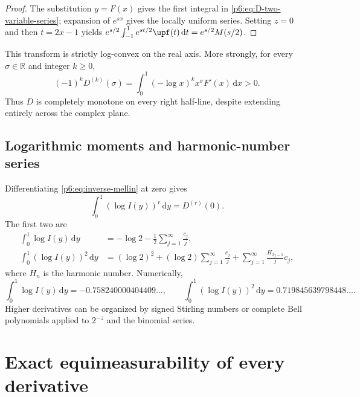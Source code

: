 \documentclass[11pt,oneside]{article}
\theoremstyle{definition}
\theoremstyle{remark}
\newcommand{\R}{\mathbb R}
\newcommand{\dd}{\,\mathrm d}
\newcommand{\1}{\mathbf 1}
\begin{document}
\begin{proof}
The substitution \(y=F(x)\) gives the first integral in
\eqref{p6:eq:D-two-variable-series}; expansion of \(e^{sx}\) gives the locally uniform
series.  Setting \(z=0\) and then \(t=2x-1\) yields
\(
 e^{s/2}\int_{-1}^1e^{st/2}\upf(t)\dd t=e^{s/2}M(s/2)
\).
\end{proof}

This transform is strictly log-convex on the real axis.  More strongly, for every
\(\sigma\in\R\) and integer \(k\ge0\),
\begin{equation}
 (-1)^kD^{(k)}(\sigma)
 =\int_0^1(-\log x)^kx^\sigma F'(x)\dd x>0.              \label{p6:eq:D-complete-monotone}
\end{equation}
Thus \(D\) is completely monotone on every right half-line, despite extending entirely
across the complex plane.

\subsection{Logarithmic moments and harmonic-number series}

Differentiating \eqref{p6:eq:inverse-mellin} at zero gives
\begin{equation}
 \int_0^1(\log I(y))^r\dd y=D^{(r)}(0).                   \label{p6:eq:inverse-log-moments}
\end{equation}
The first two are
\begin{align}
 \int_0^1\log I(y)\dd y
 &=-\log2-\frac12\sum_{j=1}^{\infty}\frac{c_j}{j},       \label{p6:eq:logI-first}\\
 \int_0^1(\log I(y))^2\dd y
 &=(\log2)^2+(\log2)\sum_{j=1}^{\infty}\frac{c_j}{j}
   +\sum_{j=1}^{\infty}\frac{H_{2j-1}}{j}c_j,            \label{p6:eq:logI-second}
\end{align}
where \(H_n\) is the harmonic number.  Numerically,
\begin{equation}
 \int_0^1\log I(y)\dd y=-0.758240000404409\ldots,\qquad
 \int_0^1(\log I(y))^2\dd y=0.719845639798448\ldots.    \label{p6:eq:logI-numeric}
\end{equation}
Higher derivatives can be organized by signed Stirling numbers or complete Bell
polynomials applied to \(2^{-z}\) and the binomial series.

\section{Exact equimeasurability of every derivative}
\end{document}
